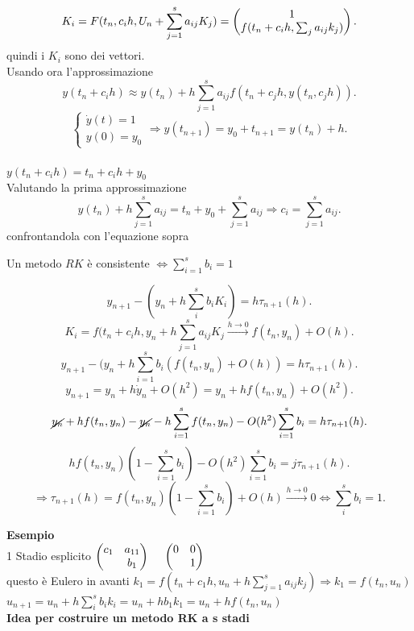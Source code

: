 \documentclass[12px]{article}
\begin{document}
	  \[
		  K_i = F(t_n,c_ih,U_n + \sum^{s}_{j=1}a_{ij}K_j)  = \begin{pmatrix}1\\f(t_n+c_ih, \sum_j a_{ij}k_j)\end{pmatrix}
	  .\] 
	  quindi i $K_i$ sono dei vettori.\\
	  Usando ora l'approssimazione
	  \[
		  y(t_n + c_ih) \approx y(t_n) + h \sum^{s}_{j=1}a_{ij}f(t_n+c_jh,y(t_n,c_jh))
	  .\] 
	  \[
	  \begin{cases}
	  	\dot y(t) = 1\\
		y(0) = y_0
	\end{cases} \Rightarrow y(t_{n+1})= y_0 + t_{n+1} = y(t_n) + h
	  .\] \\
	  $y(t_n+c_ih) = t_n + c_ih + y_0$\\
	  Valutando la prima approssimazione
	  \[
		  y(t_n) + h \sum^{s}_{j=1}a_{ij} = t_n + y_0 + \sum^{s}_{j=1}a_{ij} \Rightarrow c_i = \sum^{s}_{j=1}a_{ij}
	  .\] 
	  confrontandola con l'equazione sopra
	  \begin{prop}
	  Un metodo $RK$ è consistente $ \Leftrightarrow \sum^{s}_{i=1}b_i = 1$
	  \end{prop}
	  \begin{dimo}
	  \[
		  y_{n+1} - \left(y_n + h \sum^{s}_{i}b_iK_i \right) = h \tau_{n+1}(h)
	  .\] 
	  \[
		  K_i = f(t_n + c_i h , y_n + h \sum^{s}_{j=1}a_{ij}K_j \xrightarrow{h \rightarrow 0} f(t_n,y_n) + O(h)
	  .\] 
	  \[
		  y_{n+1} - (y_n + h \sum^{s}_{i=1}b_i(f(t_n,y_n) + O(h)) = h\tau_{n+1}(h)
	  .\] 
	  \[
		  y_{n+1} = y_n + h\dot y_n + O(h^2) = y_n + hf(t_n,y_n) + O(h^2)
	  .\] 
	  \[
		  \cancel{y_n} + hf(t_n,y_n) - \cancel{y_n} - h \sum^{s}_{i=1}f(t_n,y_n) - O(h^2) \sum^{s}_{i=1}b_i = h\tau_{n+1}(h)
	  .\] 
	  \[
		  hf(t_n,y_n) (1- \sum^{s}_{i=1}b_i) - O(h^2) \sum^{s}_{i=1}b_i = j\tau_{n+1}(h)
	  .\] 
	  \[
		  \Rightarrow \tau_{n+1}(h) = f(t_n,y_n)(1 - \sum^{s}_{i=1}b_i) + O(h) \xrightarrow{h \rightarrow 0}0 \Leftrightarrow \sum^{s}_{i}b_i = 1
	  .\] 
  \end{dimo}
	  \textbf{Esempio}\\
	  1 Stadio esplicito $\begin{pmatrix}c_1 & a_{11}\\ & b_1\end{pmatrix}$ \ \ $\begin{pmatrix}0 & 0 \\ & 1\end{pmatrix}$ \\
	  questo è Eulero in avanti  $k_1 = f(t_n+c_1h,u_n+h \sum^{s}_{j=1}a_{ij}k_j) \Rightarrow k_1 = f(t_n,u_n)$ \\
	  $u_{n+1} = u_n + h \sum^{s}_{i}b_ik_i = u_n + h b_1 k_1 = u_n + h f(t_n,u_n)$\\
	  \textbf{Idea per costruire un metodo RK a s stadi}\\
\end{document}
